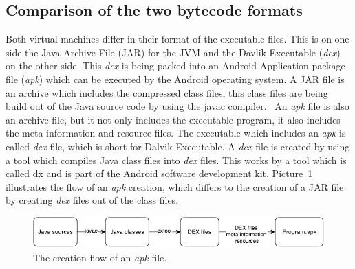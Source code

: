 \subsection{Comparison of the two bytecode formats}
\label{sec:comparison-of-the-two-bytecode-formats}
Both virtual machines differ in their format of the executable files.
This is on one side the Java Archive File (JAR) for the JVM and the Davlik Executable (\textit{dex}) on the other side.
This \textit{dex} is being packed into an Android Application package file (\textit{apk}) which can be executed by the Android operating system.
A JAR file is an archive which includes the compressed class files, this class files are being build out of the Java source code by using the javac compiler.~\cite{pugh1999compressing} 
An \textit{apk} file is also an archive file, but it not only includes the executable program, it also includes the meta information and resource files.
The executable which includes an \textit{apk} is called \textit{dex} file, which is short for Dalvik Executable.
A \textit{dex} file is created by using a tool which compiles Java class files into \textit{dex} files.
This works by a tool which is called dx and is part of the Android software development kit.
Picture~\ref{fig:create-apk} illustrates the flow of an \textit{apk} creation, which differs to the creation of a JAR file by creating \textit{dex} files out of the class files.\\
\begin{figure}[h]
\begin{center}
\includegraphics[scale=0.55]{images/create-apk.png} 
\caption{The creation flow of an \textit{apk} file.}
\label{fig:create-apk}
\end{center}
\end{figure}

